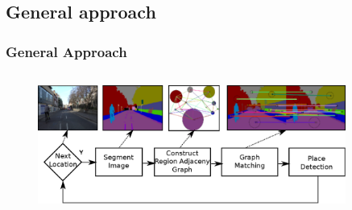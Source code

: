 \subsection{General approach}
\frame
{
	\frametitle{General Approach}
	
	\begin{columns}[t,onlytextwidth]
		\hspace*{-1cm}
		
		\vspace{-0.5cm}
		\begin{figure}[p]
			\centering
			\includegraphics[width = 0.9\textwidth]{img/icsc/diagram_approach}
		\end{figure}
		
	\end{columns}
}